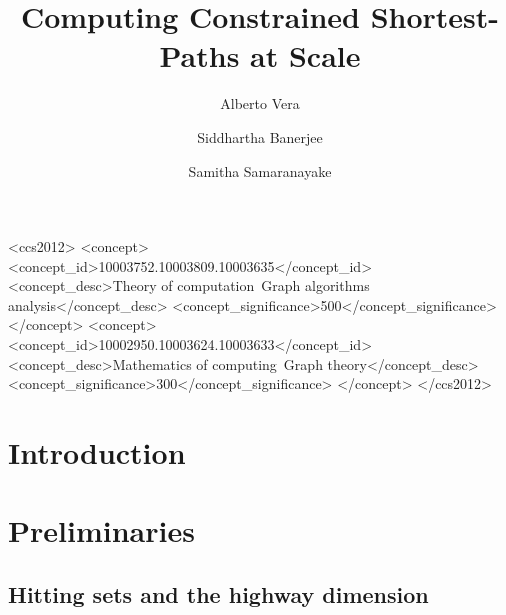 \documentclass[screen,sigconf]{acmart}
\begin{document}
\title{Computing Constrained Shortest-Paths at Scale}  
\author{Alberto Vera}
\author{Siddhartha Banerjee}
\author{Samitha Samaranayake}

\begin{abstract}

\end{abstract}



%
%
\begin{CCSXML}
<ccs2012>
<concept>
<concept_id>10003752.10003809.10003635</concept_id>
<concept_desc>Theory of computation~Graph algorithms analysis</concept_desc>
<concept_significance>500</concept_significance>
</concept>
<concept>
<concept_id>10002950.10003624.10003633</concept_id>
<concept_desc>Mathematics of computing~Graph theory</concept_desc>
<concept_significance>300</concept_significance>
</concept>
	</ccs2012>  
\end{CCSXML}




\maketitle

\section{Introduction}


\section{Preliminaries}
\label{sec:prelim}
\label{ssec:basic}


\subsection{Hitting sets and the highway dimension}
\label{ssec:hddef}

\end{document}
